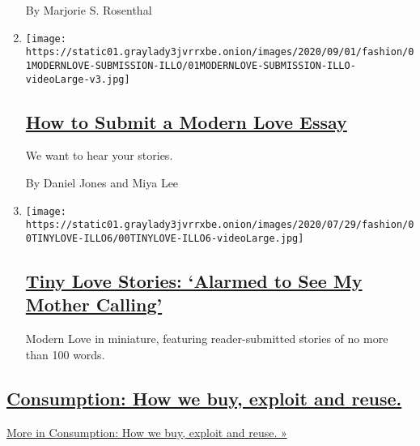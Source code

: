 \begin{enumerate}
  By Marjorie S. Rosenthal
\item
  \texttt{[image: https://static01.graylady3jvrrxbe.onion/images/2020/09/01/fashion/01MODERNLOVE-SUBMISSION-ILLO/01MODERNLOVE-SUBMISSION-ILLO-videoLarge-v3.jpg]}

  \hypertarget{how-to-submit-a-modern-love-essay}{%
  \subsection{\texorpdfstring{\href{/article/how-to-submit-a-modern-love-essay.html}{How
  to Submit a Modern Love
  Essay}}{How to Submit a Modern Love Essay}}\label{how-to-submit-a-modern-love-essay}}

  We want to hear your stories.

  By Daniel Jones and Miya Lee
\item
  \texttt{[image: https://static01.graylady3jvrrxbe.onion/images/2020/07/29/fashion/00TINYLOVE-ILLO6/00TINYLOVE-ILLO6-videoLarge.jpg]}

  \hypertarget{tiny-love-stories-alarmed-to-see-my-mother-calling}{%
  \subsection{\texorpdfstring{\href{/2020/09/01/style/tiny-modern-love-stories-alarmed-to-see-my-mother-calling.html}{Tiny
  Love Stories: `Alarmed to See My Mother
  Calling'}}{Tiny Love Stories: `Alarmed to See My Mother Calling'}}\label{tiny-love-stories-alarmed-to-see-my-mother-calling}}

  Modern Love in miniature, featuring reader-submitted stories of no
  more than 100 words.
\end{enumerate}

\hypertarget{consumption-how-we-buy-exploit-and-reuse}{%
\subsection{\texorpdfstring{\href{/issue/fashion/2019/12/16/consumption}{Consumption:
How we buy, exploit and
reuse.}}{Consumption: How we buy, exploit and reuse.}}\label{consumption-how-we-buy-exploit-and-reuse}}

\href{/issue/fashion/2019/12/16/consumption}{More in Consumption: How we
buy, exploit and reuse. »}

